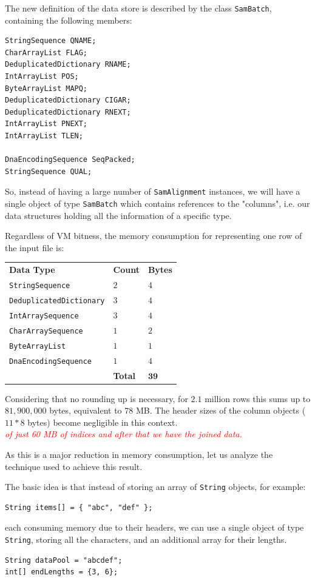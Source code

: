 \documentclass[a4paper,twoside]{article}
\begin{document}
The new definition of the data store is described by the class {\tt SamBatch}, containing the following members:
\begin{small}
\begin{verbatim}
StringSequence QNAME;
CharArrayList FLAG;
DeduplicatedDictionary RNAME;
IntArrayList POS;
ByteArrayList MAPQ;
DeduplicatedDictionary CIGAR;
DeduplicatedDictionary RNEXT;
IntArrayList PNEXT;
IntArrayList TLEN;

DnaEncodingSequence SeqPacked;
StringSequence QUAL;
\end{verbatim}
\end{small}

So, instead of having a large number of {\tt SamAlignment} instances, we will have a single object of type {\tt SamBatch} which contains references to the "columns", i.e. our data structures holding all the information of a specific type.


Regardless of VM bitness, the memory consumption for representing one row of the input file is: 
\begin{center}
\begin{tabular}{ l l l }
 {\bf Data Type} 				& {\bf Count} 		& {\bf Bytes} \\ 
 {\tt StringSequence} 			& $2$ 				& $4$ \\ 
 {\tt DeduplicatedDictionary}	& $3$ 				& $4$ \\  
 {\tt IntArraySequence}			& $3$		 		& $4$ \\  
 {\tt CharArraySequence}		& $1$				& $2$ \\  
 {\tt ByteArrayList}			& $1$				& $1$ \\  
 {\tt DnaEncodingSequence}	 	& $1$ 				& $4$ \\
 								& {\bf Total}		& $\mathbf{39}$
\end{tabular}
\end{center}

Considering that no rounding up is necessary, for $2.1$ million rows this sums up to $81,900,000$ bytes,
equivalent to $78$ MB. The header sizes of the column objects ($11*8$ bytes) become negligible in this context.
\\ \textcolor{red}{{\it of just 60 MB of indices and after that we have the joined data.}}

As this is a major reduction in memory consumption, let us analyze the technique used to achieve this result.

The basic idea is that instead of storing an array of {\tt String} objects, for example:
\begin{verbatim}
String items[] = { "abc", "def" };
\end{verbatim}
each consuming memory due to their headers, we can use 
a single object of type {\tt String}, storing all the characters, and an additional array for their lengths.
\begin{verbatim}
String dataPool = "abcdef";
int[] endLengths = {3, 6};
\end{verbatim}
\end{document}
